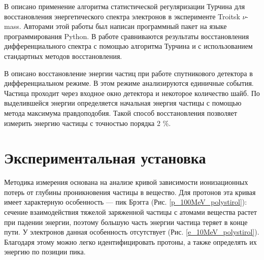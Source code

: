 \documentclass{config}
\begin{document}
В \cite{turchins_application} описано применение алгоритма статистической регуляризации Турчина для восстановления энергетического спектра электронов в эксперименте Troitsk $\nu$-mass. Авторами этой работы был написан программный пакет на языке программирования Python. В работе сравниваются результаты восстановления дифференциального спектра с помощью алгоритма Турчина и с использованием стандартных методов восстановления.

В \cite{detector_construction} описано восстановление энергии частиц при работе спутникового детектора в дифференциальном режиме. В этом режиме анализируются единичные события. Частица проходит через входное окно детектора и некоторое количество шайб. По выделившейся энергии определяется начальная энергия частицы с помощью метода максимума правдоподобия. Такой способ восстановления позволяет измерить энергию частицы с точностью порядка 2 $\%$.

\newpage

\section{Экспериментальная установка}

Методика измерения основана на анализе кривой зависимости ионизационных потерь от глубины проникновения частицы в вещество. Для протонов  эта кривая имеет характерную особенность --- пик Брэгга \cite{bragg} (Рис. \ref{p_100MeV_polystirol}): сечение взаимодействия тяжелой заряженной частицы с атомами вещества растет при падении энергии, поэтому большую часть энергии частица теряет в конце пути. У электронов данная особенность отсутствует (Рис. \ref{e_10MeV_polystirol}). Благодаря этому можно легко идентифицировать протоны, а также определять их энергию по позиции пика.
\end{document}
